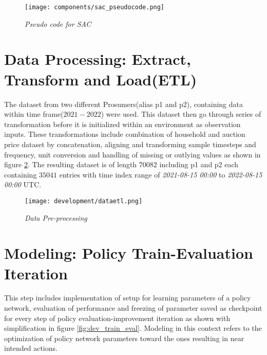 \begin{large}
\begin{figure}[h]
	\begin{center}
		\texttt{[image: components/sac\_pseudocode.png]}
		\caption{ \textit{Pseudo code for SAC}}
		\label{fig:sac_pseudocode}
	\end{center}
\end{figure}


\section{Data Processing: Extract, Transform and Load(ETL)}

The dataset from two different Prosumers(alias p1 and p2), containing data within time frame($2021-2022$) were used. This dataset then go through series of transformation before it is initialized within an environment as observation inputs. These transformations include combination of household and auction price dataset by concatenation, aligning and transforming sample timesteps and frequency, unit conversion and handling of missing or outlying values as shown in figure \ref{fig:dev_dataetl}. The resulting dataset is of length $70082$ including p1 and p2 each containing $35041$ entries with time index range of \textit{2021-08-15 00:00} to \textit{2022-08-15 00:00} UTC. \\

\begin{figure}[h]
	\begin{center}
		\texttt{[image: development/dataetl.png]}
		\caption{ \textit{Data Pre-processing} }
		\label{fig:dev_dataetl}
	\end{center}
\end{figure}


\section{Modeling: Policy Train-Evaluation Iteration}

This step includes implementation of setup for learning parameters of a policy network, evaluation of performance and freezing of parameter saved as checkpoint for every step of policy evaluation-improvement iteration as shown with simplification in figure \ref{fig:dev_train_eval}. Modeling in this context refers to the optimization of policy network parameters toward the ones resulting in near intended actions. \\


\end{large}
